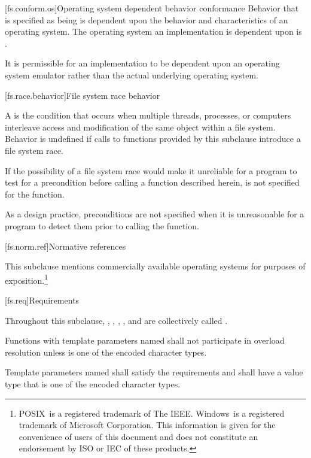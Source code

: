 [fs.conform.os]{Operating system dependent behavior conformance}
\pnum
Behavior that is specified as being
is dependent upon the behavior
and characteristics of an operating system.
The operating system an
implementation is dependent upon is
.

\pnum
It is permissible for an implementation to be dependent upon an operating
system emulator rather than the actual underlying operating system.

[fs.race.behavior]{File system race behavior}

\pnum
A  is
the condition that occurs
when multiple threads, processes, or computers interleave access and
modification of
the same object within a file system.
Behavior is undefined if calls to functions provided by this subclause introduce a file system race.

\pnum
If the possibility of a file system race would make it unreliable for a
program to test for a precondition before calling a function described herein,
\requires is not specified for the function.
\begin{note} As a design practice, preconditions are not specified when it
is unreasonable for a program to detect them prior to calling the function.
\end{note}

[fs.norm.ref]{Normative references}

\pnum
This subclause mentions commercially
available operating systems for purposes of exposition.\footnote{
POSIX\textregistered\ is a registered trademark of The IEEE\@.
Windows\textregistered\ is a registered trademark of Microsoft Corporation.
This information is given for the convenience of users of this document and
does not constitute an endorsement by ISO or IEC of these
products.
}

[fs.req]{Requirements}

\pnum
Throughout this subclause, , , ,
, and  are collectively called
.

\pnum
Functions with template parameters named 
shall not participate in overload resolution
unless  is one of the encoded character types.

\pnum
Template parameters named  shall satisfy the
 requirements and shall
have a value type that is one of the encoded character types.

